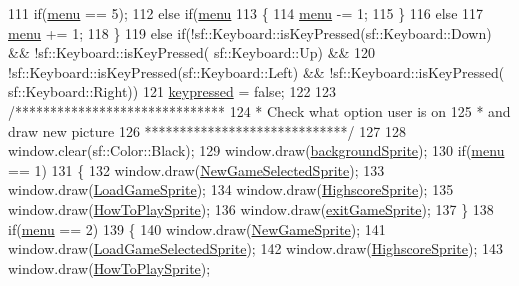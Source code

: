 \begin{DoxyCode}
111             \textcolor{keywordflow}{if}(\hyperlink{classStateMainMenu_ad717957c78811629a2a495ee98dbe0b9}{menu} == 5);
112             \textcolor{keywordflow}{else} \textcolor{keywordflow}{if}(\hyperlink{classStateMainMenu_ad717957c78811629a2a495ee98dbe0b9}{menu} %
113             \{
114                 \hyperlink{classStateMainMenu_ad717957c78811629a2a495ee98dbe0b9}{menu} -= 1;
115             \}
116             \textcolor{keywordflow}{else}
117                 \hyperlink{classStateMainMenu_ad717957c78811629a2a495ee98dbe0b9}{menu} += 1;
118         \}
119         \textcolor{keywordflow}{else} \textcolor{keywordflow}{if}(!sf::Keyboard::isKeyPressed(sf::Keyboard::Down) && !sf::Keyboard::isKeyPressed(
      sf::Keyboard::Up) &&
120                 !sf::Keyboard::isKeyPressed(sf::Keyboard::Left) && !sf::Keyboard::isKeyPressed(
      sf::Keyboard::Right))
121             \hyperlink{classStateMainMenu_aadc999cca9e9a3f1e0c0bacaea2a21a8}{keypressed} = \textcolor{keyword}{false};
122 
123         \textcolor{comment}{/******************************}
124 \textcolor{comment}{         * Check what option user is on}
125 \textcolor{comment}{         * and draw new picture}
126 \textcolor{comment}{         *****************************/}
127 
128         window.clear(sf::Color::Black);
129         window.draw(\hyperlink{classStateMainMenu_a9885f1391d304c1567feaa48aee40587}{backgroundSprite});
130         \textcolor{keywordflow}{if}(\hyperlink{classStateMainMenu_ad717957c78811629a2a495ee98dbe0b9}{menu} == 1)
131         \{
132             window.draw(\hyperlink{classStateMainMenu_a3307dac9269a6515ae9e1563487c413b}{NewGameSelectedSprite});
133             window.draw(\hyperlink{classStateMainMenu_a309cb7c0187583ea7e984d59e77c0978}{LoadGameSprite});
134             window.draw(\hyperlink{classStateMainMenu_a52b1859470406294eb22fc86a8f16453}{HighscoreSprite});
135             window.draw(\hyperlink{classStateMainMenu_aa5c71ce1a86be4f06055ed291037a10f}{HowToPlaySprite});
136             window.draw(\hyperlink{classStateMainMenu_a1640dc6e497a1d7f83a57886d31aa456}{exitGameSprite});
137         \}
138         \textcolor{keywordflow}{if}(\hyperlink{classStateMainMenu_ad717957c78811629a2a495ee98dbe0b9}{menu} == 2)
139         \{
140             window.draw(\hyperlink{classStateMainMenu_adc3e471543be20775b7c8272c8660991}{NewGameSprite});
141             window.draw(\hyperlink{classStateMainMenu_ac90a9dbfa8ec5f26b576e27afbc389a1}{LoadGameSelectedSprite});
142             window.draw(\hyperlink{classStateMainMenu_a52b1859470406294eb22fc86a8f16453}{HighscoreSprite});
143             window.draw(\hyperlink{classStateMainMenu_aa5c71ce1a86be4f06055ed291037a10f}{HowToPlaySprite});

\end{DoxyCode}
